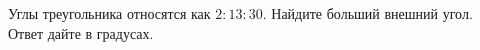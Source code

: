 \begin{ex}
	\begin{condition}
		Углы треугольника относятся как \(2:13:30\). Найдите больший внешний угол. Ответ дайте в градусах.
	\end{condition}
\end{ex}
